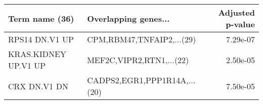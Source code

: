 \begin{tabular}{llr}
\toprule
      Term name (36) &         Overlapping genes... &  Adjusted p-value \\
\midrule
      RPS14 DN.V1 UP &    CPM,RBM47,TNFAIP2,...(29) &          7.29e-07 \\
KRAS.KIDNEY UP.V1 UP &     MEF2C,VIPR2,RTN1,...(22) &          2.50e-05 \\
        CRX DN.V1 DN & CADPS2,EGR1,PPP1R14A,...(20) &          7.50e-05 \\
\bottomrule
\end{tabular}

